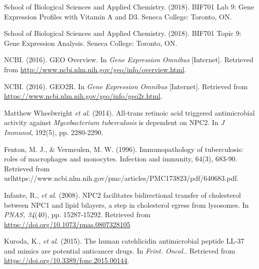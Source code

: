 \documentclass[letterpaper, 10 pt, conference]{ieeeconf}  %
\begin{document}
\addtolength{\textheight}{-12cm}  %


\begin{thebibliography}{99}

 School of Biological Sciences and Applied Chemistry. (2018). BIF701 Lab 9: Gene Expression Profiles with Vitamin A and D3. Seneca College: Toronto, ON.

 School of Biological Sciences and Applied Chemistry. (2018). BIF701 Topic 9: Gene Expression Analysis. Seneca College: Toronto, ON.

 NCBI. (2016). GEO Overview. In \textit{Gene Expression Omnibus} [Internet]. Retrieved from \url{http://www.ncbi.nlm.nih.gov/geo/info/overview.html}.

 NCBI. (2016). GEO2R. In \textit{Gene Expression Omnibus} [Internet]. Retrieved from  \url{https://www.ncbi.nlm.nih.gov/geo/info/geo2r.html}.

 Matthew Wheelwright \textit{et al}. (2014). All-trans retinoic acid triggered antimicrobial activity against \textit{Mycobacterium tuberculosis} is dependent on NPC2. In \textit{J Immunol}, 192(5), pp. 2280-2290.

 Fenton, M. J., & Vermeulen, M. W. (1996). Immunopathology of tuberculosis: roles of macrophages and monocytes. Infection and immunity, 64(3), 683-90. Retrieved from url{https://www.ncbi.nlm.nih.gov/pmc/articles/PMC173823/pdf/640683.pdf}.

 Infante, R., \textit{et al}. (2008). NPC2 facilitates bidirectional transfer of cholesterol between NPC1 and lipid bilayers, a step in cholesterol egress from lysosomes. In \textit{PNAS, 34}(40), pp. 15287-15292. Retrieved from \url{https://doi.org/10.1073/pnas.0807328105}

 Kuroda, K., \textit{et al}. (2015). The human catehlicidin antimicrobial peptide LL-37 and mimics are potential anticancer drugs. In \textit{Frint. Oncol.}. Retrieved from \url{https://doi.org/10.3389/fonc.2015.00144}.

\end{thebibliography}
\end{document}
